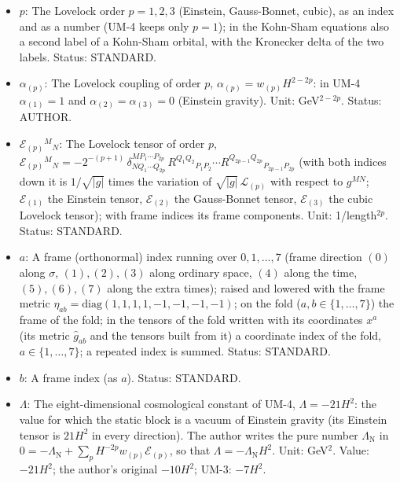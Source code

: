 \documentclass[
  10pt,
]{article}
\providecommand{\tightlist}{%
  \setlength{\itemsep}{0pt}\setlength{\parskip}{0pt}}
\begin{document}
\begin{itemize}
\tightlist
\item
  \(p\): The Lovelock order \(p = 1, 2, 3\) (Einstein, Gauss-Bonnet,
  cubic), as an index and as a number (UM-4 keeps only \(p = 1\)); in
  the Kohn-Sham equations also a second label of a Kohn-Sham orbital,
  with the Kronecker delta of the two labels. Status: STANDARD.
\item
  \(\alpha_{(p)}\): The Lovelock coupling of order \(p\),
  \(\alpha_{(p)} = w_{(p)}H^{2-2p}\): in UM-4 \(\alpha_{(1)} = 1\) and
  \(\alpha_{(2)} = \alpha_{(3)} = 0\) (Einstein gravity). Unit:
  GeV\(^{2-2p}\). Status: AUTHOR.
\item
  \(\mathcal{E}_{(p)}{}^M{}_N\): The Lovelock tensor of order \(p\),
  \(\mathcal{E}_{(p)}{}^M{}_N = -2^{-(p+1)}\,\delta^{MP_1\cdots P_{2p}}_{NQ_1\cdots Q_{2p}}\,R^{Q_1Q_2}{}_{P_1P_2}\cdots R^{Q_{2p-1}Q_{2p}}{}_{P_{2p-1}P_{2p}}\)
  (with both indices down it is \(1/\sqrt{\lvert g\rvert}\) times the
  variation of \(\sqrt{\lvert g\rvert}\,\mathcal{L}_{(p)}\) with respect
  to \(g^{MN}\); \(\mathcal{E}_{(1)}\) the Einstein tensor,
  \(\mathcal{E}_{(2)}\) the Gauss-Bonnet tensor, \(\mathcal{E}_{(3)}\)
  the cubic Lovelock tensor); with frame indices its frame components.
  Unit: 1/length\(^{2p}\). Status: STANDARD.
\item
  \(a\): A frame (orthonormal) index running over \(0, 1, \dots, 7\)
  (frame direction \((0)\) along \(\sigma\), \((1), (2), (3)\) along
  ordinary space, \((4)\) along the time, \((5), (6), (7)\) along the
  extra times); raised and lowered with the frame metric
  \(\eta_{ab} = \mathrm{diag}(1, 1, 1, 1, -1, -1, -1, -1)\); on the fold
  (\(a, b \in \{1, \dots, 7\}\)) the frame of the fold; in the tensors
  of the fold written with its coordinates \(x^a\) (its metric
  \(\hat g_{ab}\) and the tensors built from it) a coordinate index of
  the fold, \(a \in \{1, \dots, 7\}\); a repeated index is summed.
  Status: STANDARD.
\item
  \(b\): A frame index (as \(a\)). Status: STANDARD.
\item
  \(\Lambda\): The eight-dimensional cosmological constant of UM-4,
  \(\Lambda = -21H^2\): the value for which the static block is a vacuum
  of Einstein gravity (its Einstein tensor is \(21H^2\) in every
  direction). The author writes the pure number \(\Lambda_{\mathrm{N}}\)
  in
  \(0 = -\Lambda_{\mathrm{N}} + \sum_p H^{-2p}w_{(p)}\mathcal{E}_{(p)}\),
  so that \(\Lambda = -\Lambda_{\mathrm{N}}H^2\). Unit: GeV\(^2\).
  Value: \(-21H^2\); the author's original \(-10H^2\); UM-3: \(-7H^2\).

\end{itemize}
\end{document}
